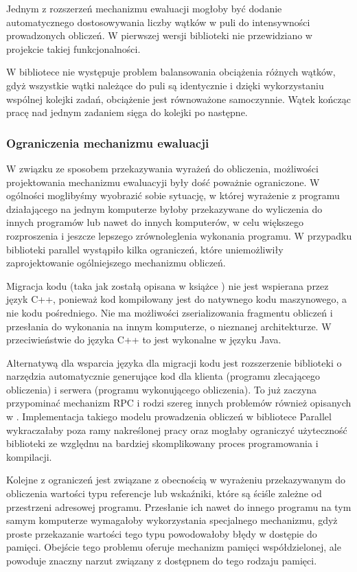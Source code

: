   Jednym z rozszerzeń mechanizmu ewaluacji mogłoby być dodanie automatycznego dostosowywania liczby wątków w puli do intensywności prowadzonych obliczeń.
  W pierwszej wersji biblioteki nie przewidziano w projekcie takiej funkcjonalności.
  
  W bibliotece nie występuje problem balansowania obciążenia różnych wątków, gdyż wszystkie wątki należące do puli są identycznie i dzięki wykorzystaniu wspólnej kolejki zadań, obciążenie jest równoważone samoczynnie.
  Wątek kończąc pracę nad jednym zadaniem sięga do kolejki po następne.
  
\subsubsection{Ograniczenia mechanizmu ewaluacji}

  W związku ze sposobem przekazywania wyrażeń do obliczenia, możliwości projektowania mechanizmu ewaluacyji były dość poważnie ograniczone.
  W ogólności moglibyśmy wyobrazić sobie sytuację, w której wyrażenie z programu działającego na jednym komputerze byłoby przekazywane do wyliczenia do innych programów lub nawet do innych komputerów, w celu większego rozproszenia i jeszcze lepszego zrównoleglenia wykonania programu.
  W przypadku biblioteki parallel wystąpiło kilka ograniczeń, które uniemożliwiły zaprojektowanie ogólniejszego mechanizmu obliczeń.
  
  Migracja kodu (taka jak zostałą opisana w książce \cite{dissys}) nie jest wspierana przez język C++, ponieważ kod kompilowany jest do natywnego kodu maszynowego, a nie kodu pośredniego.
  Nie ma możliwości zserializowania fragmentu obliczeń i przesłania do wykonania na innym komputerze, o nieznanej architekturze.
  W przeciwieństwie do języka C++ to jest wykonalne w języku Java.
  
  Alternatywą dla wsparcia języka dla migracji kodu jest rozszerzenie biblioteki o narzędzia automatycznie generujące kod dla klienta (programu zlecającego obliczenia) i serwera (programu wykonującego obliczenia).
  To już zaczyna przypominać mechanizm RPC i rodzi szereg innych problemów również opisanych w \cite{dissys}.
  Implementacja takiego modelu prowadzenia obliczeń w bibliotece Parallel wykraczałaby poza ramy nakreślonej pracy oraz mogłaby ograniczyć użyteczność biblioteki ze względnu na bardziej skomplikowany proces programowania i kompilacji.
  
  Kolejne z ograniczeń jest związane z obecnością w wyrażeniu przekazywanym do obliczenia wartości typu referencje lub wskaźniki, które są ściśle zależne od przestrzeni adresowej programu. 
  Przesłanie ich nawet do innego programu na tym samym komputerze wymagałoby wykorzystania specjalnego mechanizmu, gdyż proste przekazanie wartości tego typu powodowałoby błędy w dostępie do pamięci.
  Obejście tego problemu oferuje mechanizm pamięci współdzielonej, ale powoduje znaczny narzut związany z dostępnem do tego rodzaju pamięci.
 
